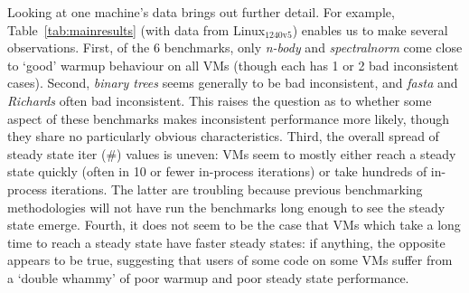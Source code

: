 \documentclass[acmsmall,screen]{acmart}
\newcommand{\binarytrees}{\emph{binary trees}\xspace}
\newcommand{\richards}{\emph{Richards}\xspace}
\newcommand{\spectralnorm}{\emph{spectralnorm}\xspace}
\newcommand{\nbody}{\emph{n-body}\xspace}
\newcommand{\fasta}{\emph{fasta}\xspace}
\newcommand{\bencherseven}{Linux$_\mathrm{1240v5}$\xspace}
\DeclareRobustCommand{\warmup}{%
\setlength{\sparklinethickness}{0.4pt}%
\begin{sparkline}{1.5}
\spark 0.1 0.8
       0.5 0.8
       0.5 0.0
       0.9 0.0
       /%
\end{sparkline}\xspace%
}
\DeclareRobustCommand{\slowdown}{%
\setlength{\sparklinethickness}{0.4pt}%
\begin{sparkline}{1.5}
\spark 0.1 0.0
       0.5 0.0
       0.5 0.8
       0.9 0.8
       /%
\end{sparkline}\xspace%
}
\DeclareRobustCommand{\badinconsistent}{%
\setlength{\sparklinethickness}{0.4pt}%
\begin{sparkline}{1.5}
\spark 0.1 0.4
       0.9 0.4
       /%
\spark 0.1 0.2
       0.9 0.2
       /%
\spark 0.1 0.6
       0.9 0.0
       /%
\spark 0.1 0.0
       0.9 0.6
       /%
\end{sparkline}\xspace%
}
\begin{document}
Looking at one machine's data brings out further detail. For
example, Table~\ref{tab:mainresults} (with data from \bencherseven)
enables us to make several observations. First, of the 6 benchmarks, only \nbody and \spectralnorm
come close to `good' warmup behaviour on all VMs (though each has 1 or 2 bad
inconsistent cases). Second, \binarytrees seems generally to be bad inconsistent,
and \fasta and \richards often bad inconsistent. This raises the question as to whether some
aspect of these benchmarks makes inconsistent performance more likely,
though they share no particularly obvious characteristics.
Third, the overall spread of steady state iter (\#) values is uneven: VMs seem
to mostly either reach a steady state quickly (often in 10 or fewer in-process
iterations) or take hundreds of in-process iterations. The latter are troubling
because previous benchmarking methodologies
will not have run the benchmarks long enough to see the steady state emerge.
Fourth, it does not seem to be the case that VMs which take a long
time to reach a steady state have faster steady states: if anything,
the opposite appears to be true, suggesting that users of some code
on some VMs suffer from a `double whammy' of poor warmup and poor
steady state performance.


\end{document}

